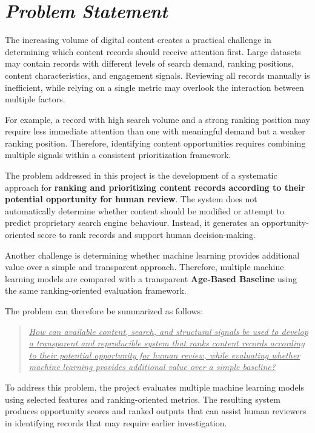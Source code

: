 \documentclass[12pt,a4paper]{report}
\begin{document}
\section{\textit{Problem Statement}}
The increasing volume of digital content creates a practical challenge in determining which content records should receive attention first. Large datasets may contain records with different levels of search demand, ranking positions, content characteristics, and engagement signals. Reviewing all records manually is inefficient, while relying on a single metric may overlook the interaction between multiple factors.

For example, a record with high search volume and a strong ranking position may require less immediate attention than one with meaningful demand but a weaker ranking position. Therefore, identifying content opportunities requires combining multiple signals within a consistent prioritization framework.

The problem addressed in this project is the development of a systematic approach for \textbf{ranking and prioritizing content records according to their potential opportunity for human review}. The system does not automatically determine whether content should be modified or attempt to predict proprietary search engine behaviour. Instead, it generates an opportunity-oriented score to rank records and support human decision-making.

Another challenge is determining whether machine learning provides additional value over a simple and transparent approach. Therefore, multiple machine learning models are compared with a transparent \textbf{Age-Based Baseline} using the same ranking-oriented evaluation framework.

The problem can therefore be summarized as follows:

\begin{quote}
\itshape
\uline{How can available content, search, and structural signals be used to develop a transparent and reproducible system that ranks content records according to their potential opportunity for human review, while evaluating whether machine learning provides additional value over a simple baseline?}
\end{quote}

To address this problem, the project evaluates multiple machine learning models using selected features and ranking-oriented metrics. The resulting system produces opportunity scores and ranked outputs that can assist human reviewers in identifying records that may require earlier investigation.
\end{document}
